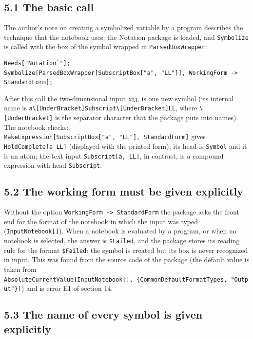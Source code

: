 \documentclass[
  10pt,
]{article}
\begin{document}
\hypertarget{the-basic-call}{%
\subsection{5.1 The basic call}\label{the-basic-call}}

The author's note on creating a symbolized variable by a program
describes the technique that the notebook uses: the Notation package is
loaded, and \texttt{Symbolize} is called with the box of the symbol
wrapped in \texttt{ParsedBoxWrapper}:

\begin{verbatim}
Needs["Notation`"];
Symbolize[ParsedBoxWrapper[SubscriptBox["a", "LL"]], WorkingForm -> StandardForm];
\end{verbatim}

After this call the two-dimensional input \(a_{\rm LL}\) is one new
symbol (its internal name is
\texttt{a\textbackslash{}{[}UnderBracket{]}Subscript\textbackslash{}{[}UnderBracket{]}LL},
where \texttt{\textbackslash{}{[}UnderBracket{]}} is the separator
character that the package puts into names). The notebook checks:
\texttt{MakeExpression{[}SubscriptBox{[}"a",\ "LL"{]},\ StandardForm{]}}
gives \texttt{HoldComplete{[}a\_LL{]}} (displayed with the printed
form), its head is \texttt{Symbol} and it is an atom; the text input
\texttt{Subscript{[}a,\ LL{]}}, in contrast, is a compound expression
with head \texttt{Subscript}.

\hypertarget{the-working-form-must-be-given-explicitly}{%
\subsection{5.2 The working form must be given
explicitly}\label{the-working-form-must-be-given-explicitly}}

Without the option \texttt{WorkingForm\ -\textgreater{}\ StandardForm}
the package asks the front end for the format of the notebook in which
the input was typed (\texttt{InputNotebook{[}{]}}). When a notebook is
evaluated by a program, or when no notebook is selected, the answer is
\texttt{\$Failed}, and the package stores its reading rule for the
format \texttt{\$Failed}: the symbol is created but its box is never
recognized in input. This was found from the source code of the package
(the default value is taken from
\texttt{AbsoluteCurrentValue{[}InputNotebook{[}{]},\ \{CommonDefaultFormatTypes,\ "Output"\}{]}})
and is error E1 of section 14.

\hypertarget{the-name-of-every-symbol-is-given-explicitly}{%
\subsection{5.3 The name of every symbol is given
explicitly}\label{the-name-of-every-symbol-is-given-explicitly}}
\end{document}
